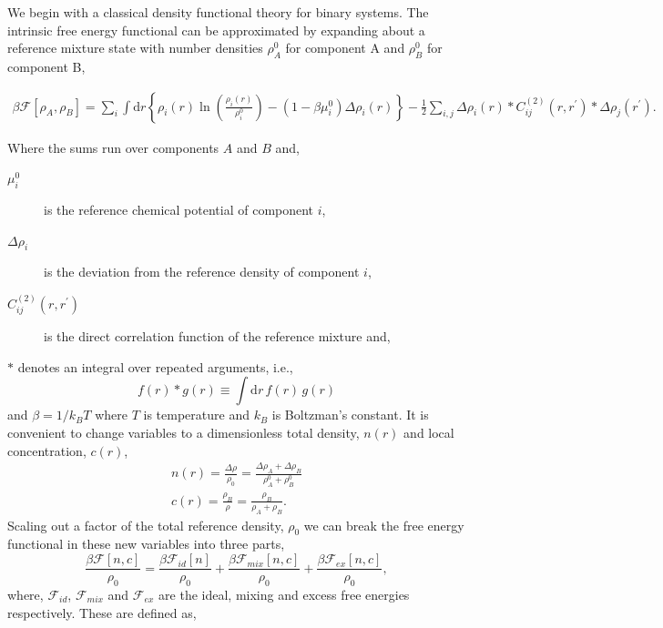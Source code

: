 \documentclass[showkeys, prb, reprint]{revtex4-1}
\newcommand{\F}{\mathcal{F}}    %
\renewcommand{\l}{\left}        %
\renewcommand{\r}{\right}       %
\newcommand{\f}{\frac}          %
\newcommand{\A}{\rho_A}         %
\newcommand{\B}{\rho_B}         %
\newcommand{\integrate}[1]{\int\!\mathrm{d}#1}
\begin{document}
We begin with a  classical density functional theory for binary systems. The intrinsic free
energy functional can be approximated by expanding about a reference mixture state
with number densities $\rho_A^0$ for component A and $\rho_B^0$ for component
B,
\begin{widetext}
%
\begin{gather}\label{binary_cdft_free_energy}
    \beta\F[\A, \B] = \sum_{i} \integrate{r} 
        \l\lbrace \rho_i(r) \ln\l(\f{\rho_i(r)}{\rho_i^0}\r) 
        - (1 - \beta\mu_i^0)\Delta\rho_i(r) \r\rbrace
    - \f{1}{2} \sum_{i,j} \Delta\rho_i(r) \ast C^{(2)}_{ij}(r, r^\prime) 
        \ast \Delta\rho_j(r^\prime). 
\end{gather}
%
\end{widetext}
Where the sums run over components $A$ and $B$ and,
\begin{description}
    \item[$\mu_i^0$] is the reference chemical potential of component $i$,
    \item[$\Delta\rho_i$] is the deviation from the reference density of component $i$,
    \item[$C^{(2)}_{ij}(r, r^\prime)$] is the direct correlation function
        of the reference mixture and,
\end{description}
%
$\ast$ denotes an integral over repeated arguments, i.e.,
%
\begin{equation}
    \label{eq:ast_def}
    f(r) \ast g(r) \equiv \integrate{r} \, f(r) \, g(r)
\end{equation}
%
and $\beta=1/k_BT$ where $T$ is temperature and $k_B$ is Boltzman's constant. It is convenient to change variables to a dimensionless total density, $n(r)$
and local concentration, $c(r)$,
%
\begin{gather}
    n(r) = \f{\Delta \rho}{\rho_0} = \f{\Delta\A + \Delta\B}{\A^0 + \B^0} \\
    c(r) = \f{\B}{\rho} = \f{\B}{\A + \B}.
\end{gather}
%
Scaling out a factor of the total reference density, $\rho_0$ we can break the
free energy functional in these new variables into three parts,
%
\begin{equation}
    \label{binary_total_free_energy}
    \f{\beta\F[n, c]}{\rho_0} = \f{\beta\F_{id}[n]}{\rho_0} 
        + \f{\beta\F_{mix}[n, c]}{\rho_0}
        + \f{\beta\F_{ex}[n, c]}{\rho_0},
\end{equation}
%
where, $\F_{id}$, $\F_{mix}$ and $\F_{ex}$ are the ideal, mixing and excess
free energies respectively. These are defined as,
\end{document}
